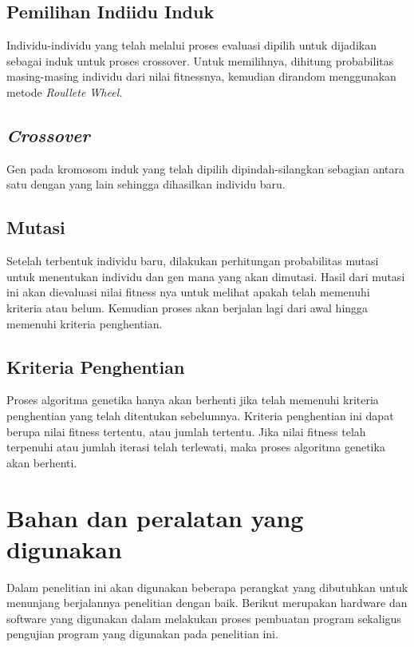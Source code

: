   \subsection{Pemilihan Indiidu Induk}
  
  Individu-individu yang telah melalui proses evaluasi dipilih untuk dijadikan sebagai induk untuk proses crossover. 
  Untuk memilihnya, dihitung probabilitas masing-masing individu dari nilai fitnessnya, kemudian dirandom menggunakan metode \emph{Roullete Wheel.}
 
  \subsection{\emph{Crossover}}
  
  Gen pada kromosom induk yang telah dipilih dipindah-silangkan sebagian antara satu dengan yang lain sehingga dihasilkan individu baru.

  \subsection{Mutasi}
  
  Setelah terbentuk individu baru, dilakukan perhitungan probabilitas mutasi untuk menentukan individu dan gen mana yang akan dimutasi. 
  Hasil dari mutasi ini akan dievaluasi nilai fitness nya untuk melihat apakah telah memenuhi kriteria atau belum. Kemudian proses akan berjalan lagi dari awal hingga memenuhi kriteria penghentian.
  
  \subsection{Kriteria Penghentian}
  
  Proses algoritma genetika hanya akan berhenti jika telah memenuhi kriteria penghentian yang telah ditentukan sebelumnya. 
  Kriteria penghentian ini dapat berupa nilai fitness tertentu, atau jumlah tertentu. 
  Jika nilai fitness telah terpenuhi atau jumlah iterasi telah terlewati, maka proses algoritma genetika akan berhenti.

\section{Bahan dan peralatan yang digunakan}
Dalam penelitian ini akan digunakan beberapa perangkat yang dibutuhkan untuk menunjang berjalannya penelitian dengan baik.
Berikut merupakan hardware dan software yang digunakan dalam melakukan proses pembuatan program sekaligus pengujian program yang digunakan pada penelitian ini.
